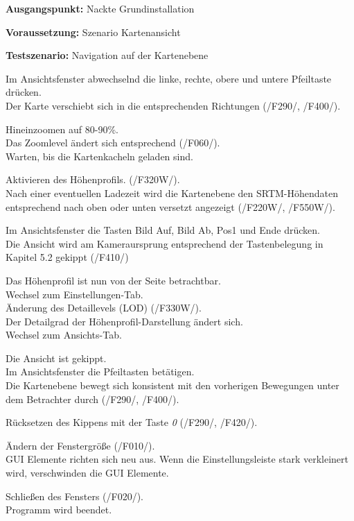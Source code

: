 \documentclass[10pt]{scrreprt}
\newcommand{\sfbf}[1]{\textbf{\sffamily #1}}
\newcommand{\ziel}[1]{{\fontsize{9.5}{11}\textsf{/#1/}}}
\newcommand{\ziellabel}{Z}
\newcommand{\muss}{\renewcommand{\labelenumi}{\textbf{\ziel{\ziellabel\numprint{\theenumi}0}}}}
\newcommand{\wunsch}{\renewcommand{\labelenumi}{\textbf{\ziel{\ziellabel\numprint{\theenumi}0W}}}}
\newenvironment{details}[1][6pt]{%
  \parskip#1 \parindent6mm \raggedright%
  \def\item{\par\ignorespaces\hangindent=5mm \hangafter1}}{%
  \par\ignorespaces}
\begin{document}
\newpage
\vspace{1.0cm}
\begin{details}[2pt]
\item \sfbf{Ausgangspunkt:} Nackte Grundinstallation 
\item \sfbf{Voraussetzung:} Szenario Kartenansicht
\item \sfbf{Testszenario:} Navigation auf der Kartenebene
\end{details}
\vspace{2mm}
\begin{enumerate}[leftmargin = 2.2cm, resume]
\item Im Ansichtsfenster abwechselnd die linke, rechte, obere und untere Pfeiltaste drücken.\\Der Karte verschiebt sich in die entsprechenden Richtungen (\ziel{F290}, \ziel{F400}).
\item Hineinzoomen auf 80-90\%.\\ Das Zoomlevel ändert sich entsprechend (\ziel{F060}).\\ Warten, bis die Kartenkacheln geladen sind.
\wunsch
\item Aktivieren des Höhenprofils. (\ziel{F320W}).\\ Nach einer eventuellen Ladezeit wird die Kartenebene den SRTM-Höhendaten entsprechend nach oben oder unten versetzt angezeigt (\ziel{F220W}, \ziel{F550W}).
\muss
\item Im Ansichtsfenster die Tasten Bild Auf, Bild Ab, Pos1 und Ende drücken.\\Die Ansicht wird am Kameraursprung entsprechend der Tastenbelegung in Kapitel 5.2 gekippt (\ziel{F410})
\wunsch
\item Das Höhenprofil ist nun von der Seite betrachtbar.\\Wechsel zum Einstellungen-Tab.\\Änderung des Detaillevels (LOD) (\ziel{F330W}).\\Der Detailgrad der Höhenprofil-Darstellung ändert sich.\\Wechsel zum Ansichts-Tab.
\muss
\item Die Ansicht ist gekippt.\\ Im Ansichtsfenster die Pfeiltasten betätigen.\\Die Kartenebene bewegt sich konsistent mit den vorherigen Bewegungen unter dem Betrachter durch (\ziel{F290}, \ziel{F400}).
\item Rücksetzen des Kippens mit der Taste \textit{0} (\ziel{F290}, \ziel{F420}).
\item Ändern der Fenstergröße (\ziel{F010}).\\GUI Elemente richten sich neu aus. Wenn die Einstellungsleiste stark verkleinert wird, verschwinden die GUI Elemente.
\item Schließen des Fensters (\ziel{F020}).\\Programm wird beendet.
\end{enumerate}
\end{document}
